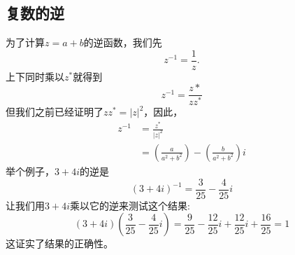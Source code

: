 \subsection{复数的逆}
为了计算$z=a+b$的逆函数，我们先
$$
  z^{-1}=\frac{1}{z} .
$$
上下同时乘以$z^{*}$就得到
$$
  z^{-1}=\frac{z *}{z z^{*}}
$$
但我们之前已经证明了$z z^{*}=|z|^{2}$，因此，
$$
  \begin{aligned}
    z^{-1} & =\frac{z^{*}}{|z|^{2}}                                                   \\
           & =\left(\frac{a}{a^{2}+b^{2}}\right)-\left(\frac{b}{a^{2}+b^{2}}\right) i
  \end{aligned}
$$
举个例子，$3+ 4i $的逆是
$$
  (3+4 i)^{-1}=\frac{3}{25}-\frac{4}{25} i
$$
让我们用$3+4 i$乘以它的逆来测试这个结果:
$$
  (3+4 i)\left(\frac{3}{25}-\frac{4}{25} i\right)=\frac{9}{25}-\frac{12}{25} i+\frac{12}{25} i+\frac{16}{25}=1
$$
这证实了结果的正确性。

